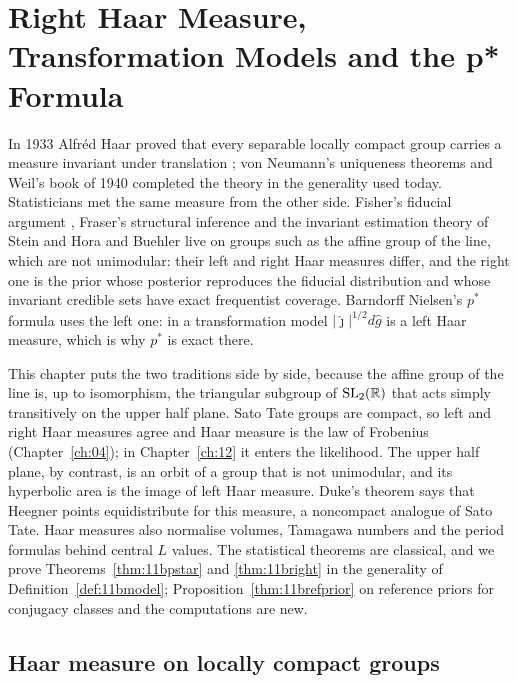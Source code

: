 \chapter[Haar Measure and the p* Formula]{Right Haar Measure, Transformation Models and the p* Formula}\label{ch:11b}

In 1933 Alfr\'ed Haar proved that every separable locally compact group carries a measure invariant under translation \cite{haar1933}; von Neumann's uniqueness theorems and Weil's book of 1940 completed the theory in the generality used today. Statisticians met the same measure from the other side. Fisher's fiducial argument \cite{fisher1935}, Fraser's structural inference \cite{fraser1968} and the invariant estimation theory of Stein \cite{stein1965} and Hora and Buehler \cite{horabuehler1966} live on groups such as the affine group of the line, which are not unimodular: their left and right Haar measures differ, and the right one is the prior whose posterior reproduces the fiducial distribution and whose invariant credible sets have exact frequentist coverage. Barndorff Nielsen's $p^*$ formula \cite{barndorffnielsen1983} uses the left one: in a transformation model $|\hat\jmath|^{1/2}d\hat g$ is a left Haar measure, which is why $p^*$ is exact there.

This chapter puts the two traditions side by side, because the affine group of the line is, up to isomorphism, the triangular subgroup of $\mathrm{SL}_2(\mathbb{R})$ that acts simply transitively on the upper half plane. Sato Tate groups are compact, so left and right Haar measures agree and Haar measure is the law of Frobenius (Chapter~\ref{ch:04}); in Chapter~\ref{ch:12} it enters the likelihood. The upper half plane, by contrast, is an orbit of a group that is not unimodular, and its hyperbolic area is the image of left Haar measure. Duke's theorem says that Heegner points equidistribute for this measure, a noncompact analogue of Sato Tate. Haar measures also normalise volumes, Tamagawa numbers and the period formulas behind central $L$ values. The statistical theorems are classical, and we prove Theorems~\ref{thm:11bpstar} and \ref{thm:11bright} in the generality of Definition~\ref{def:11bmodel}; Proposition~\ref{thm:11brefprior} on reference priors for conjugacy classes and the computations are new.

\section{Haar measure on locally compact groups}


